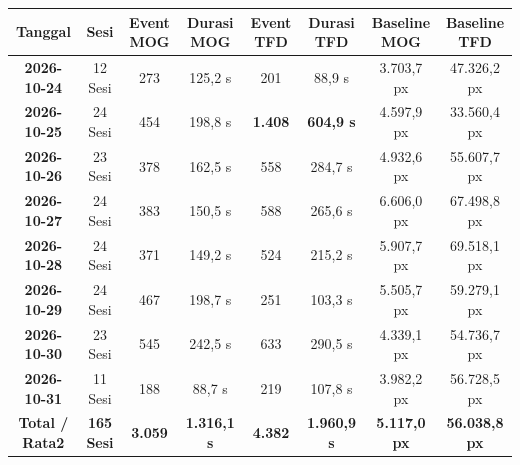 \documentclass[10pt,a4paper]{article}
\begin{document}
\begin{table}[h!]
\centering
\small
\begin{tabular}{|c|c|c|c|c|c|c|c|}
\hline
\textbf{Tanggal} & \textbf{Sesi} & \textbf{Event MOG} & \textbf{Durasi MOG} & \textbf{Event TFD} & \textbf{Durasi TFD} & \textbf{Baseline MOG} & \textbf{Baseline TFD} \\
\hline
\textbf{2026-10-24} & 12 Sesi & 273 & 125,2 s & 201 & 88,9 s & 3.703,7 px & 47.326,2 px \\
\textbf{2026-10-25} & 24 Sesi & 454 & 198,8 s & \textbf{1.408} & \textbf{604,9 s} & 4.597,9 px & 33.560,4 px \\
\textbf{2026-10-26} & 23 Sesi & 378 & 162,5 s & 558 & 284,7 s & 4.932,6 px & 55.607,7 px \\
\textbf{2026-10-27} & 24 Sesi & 383 & 150,5 s & 588 & 265,6 s & 6.606,0 px & 67.498,8 px \\
\textbf{2026-10-28} & 24 Sesi & 371 & 149,2 s & 524 & 215,2 s & 5.907,7 px & 69.518,1 px \\
\textbf{2026-10-29} & 24 Sesi & 467 & 198,7 s & 251 & 103,3 s & 5.505,7 px & 59.279,1 px \\
\textbf{2026-10-30} & 23 Sesi & 545 & 242,5 s & 633 & 290,5 s & 4.339,1 px & 54.736,7 px \\
\textbf{2026-10-31} & 11 Sesi & 188 & 88,7 s & 219 & 107,8 s & 3.982,2 px & 56.728,5 px \\
\hline
\textbf{Total / Rata2} & \textbf{165 Sesi} & \textbf{3.059} & \textbf{1.316,1 s} & \textbf{4.382} & \textbf{1.960,9 s} & \textbf{5.117,0 px} & \textbf{56.038,8 px} \\
\hline
\end{tabular}
\end{table}

\vspace{-4pt}
\end{document}
